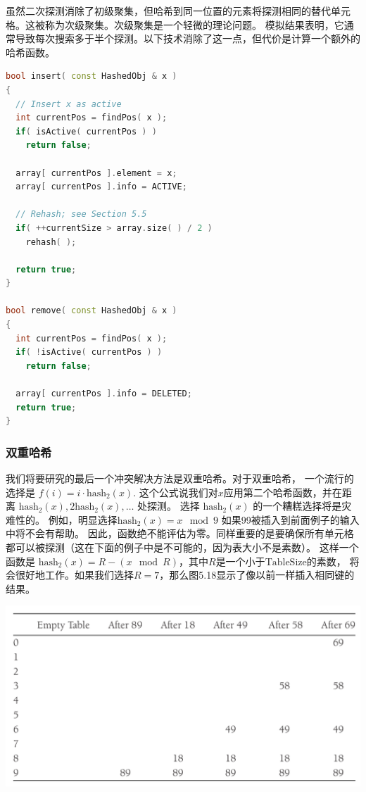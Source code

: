 \documentclass[a4paper]{ctexart}
\theoremstyle{definition}
\theoremstyle{definition}
\begin{document}
虽然二次探测消除了初级聚集，但哈希到同一位置的元素将探测相同的替代单元格。这被称为次级聚集。次级聚集是一个轻微的理论问题。
模拟结果表明，它通常导致每次搜索多于半个探测。以下技术消除了这一点，但代价是计算一个额外的哈希函数。

\begin{lstlisting}[language=C++]
bool insert( const HashedObj & x )
{
  // Insert x as active
  int currentPos = findPos( x );
  if( isActive( currentPos ) )
    return false;
  
  array[ currentPos ].element = x;
  array[ currentPos ].info = ACTIVE;
  
  // Rehash; see Section 5.5
  if( ++currentSize > array.size( ) / 2 )
    rehash( );
  
  return true;
}

bool remove( const HashedObj & x )
{
  int currentPos = findPos( x );
  if( !isActive( currentPos ) )
    return false;
  
  array[ currentPos ].info = DELETED;
  return true;
}
\end{lstlisting}

\subsubsection{双重哈希}

我们将要研究的最后一个冲突解决方法是双重哈希。对于双重哈希，
一个流行的选择是 $f(i) = i \cdot \text{hash}_2(x)$. 
这个公式说我们对$x$应用第二个哈希函数，并在距离 
$\text{hash}_2(x), 2\text{hash}_2(x), \ldots$ 处探测。
选择 $\text{hash}_2(x)$ 的一个糟糕选择将是灾难性的。
例如，明显选择$\text{hash}_2(x) = x \mod 9$ 如果99被插入到前面例子的输入中将不会有帮助。
因此，函数绝不能评估为零。同样重要的是要确保所有单元格都可以被探测（这在下面的例子中是不可能的，因为表大小不是素数）。
这样一个函数是 $\text{hash}_2(x) = R - (x \mod R)$，其中$R$是一个小于$\text{TableSize}$的素数，
将会很好地工作。如果我们选择$R = 7$，那么图5.18显示了像以前一样插入相同键的结果。

\begin{center}
  \includegraphics[width = 0.75 \textwidth]{images/double_hash.PNG}
\end{center}
\end{document}
